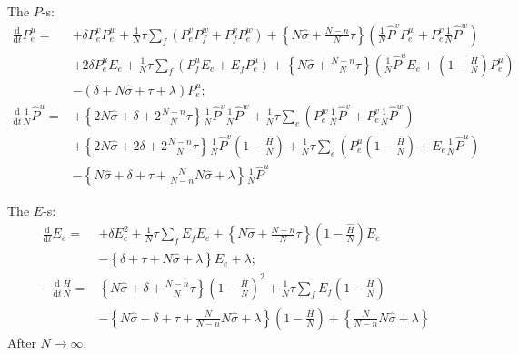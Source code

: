\documentclass[preprint, 
superscriptaddress,aip,author-year]{revtex4-1}
\begin{document}
\noindent The $P$-s:
\begin{align}
 \frac{\mathrm{d}}{\mathrm{d} t} P_e^u  =&  
+ \delta P_e^v  P_e^w + \frac{1}{N} \tau \sum_f  \left( P_e^v P_f^w +
  P_f^v P_e^w  \right) + \left\{ N \hat \sigma + \frac{N-n}{N} \tau
\right\}\left(  \frac{1}{N} \hat P^v P_e^w +P_e^v \frac{1}{N} \hat P^w \right)\nonumber \\
&+ 2 \delta P_e^u E_e + \frac{1}{N} \tau \sum_f  \left( P_f^u E_e 
+ E_f P_e^u \right) + \left\{ N \hat \sigma +  \frac{N-n}{N} \tau \right\} \left(\frac{1}{N} \hat P^u  E_e + (1-\frac{\hat H}{N})  P_e^u\right) \nonumber \\
& -  ( \delta    +  N \hat \sigma  + \tau  + \lambda ) P_e^u;
\tag{PE}\\ 
\frac{\mathrm{d}}{\mathrm{d} t}  \frac{1}{N} \hat P^u =& 
 +\left\{ 2 N \hat \sigma+  \delta + 2 \frac{N-n}{N} \tau \right\} \frac{1}{N} \hat P^v \frac{1}{N} \hat P^w  + \frac{1}{N}\tau \sum_e \left( P_e^w \frac{1}{N} \hat P^v +  P_e^v \frac{1}{N} \hat P^w \right) \nonumber \\
&  +\left\{ 2 N \hat \sigma+  2\delta + 2 \frac{N-n}{N} \tau \right\} \frac{1}{N} \hat P^v  (1-\frac{\hat H}{N})  + \frac{1}{N}\tau \sum_e \left( P_e^u (1-\frac{\hat H}{N}) +  E_e \frac{1}{N} \hat P^u \right) 
\nonumber \\
& -\left\{N \hat \sigma + \delta +\tau + \frac{N}{N-n} N \hat \sigma + \lambda \right\}  \frac{1}{N} \hat P^u
\tag{PB}
\end{align}


\noindent The $E$-s:
\begin{align}
\frac{\mathrm{d}}{\mathrm{d} t} E_e =&
+\delta E_e^2 + \frac{1}{N} \tau\sum_{f } E_f  E_e  + \left\{ N \hat \sigma  + \frac{N-n}{N} \tau \right\}(1-\frac{\hat H}{N})  E_e\nonumber \\
& - \left\{ \delta + \tau + N \hat \sigma + \lambda \right\} E_e +\lambda; \tag{EE} \\
- \frac{\mathrm{d}}{\mathrm{d} t} \frac{\hat H}{N} =&
\left\{ N \hat \sigma  + \delta +  \frac{N-n}{N} \tau\right\}  \left(1-\frac{\hat H}{N}\right)^2 +\frac{1}{N} \tau\sum_{f } E_f (1-\frac{\hat H}{N}) \nonumber \\
& - \left\{ N \hat \sigma  + \delta +  \tau + \frac{N}{N-n} N \hat \sigma +  \lambda \right\}(1-\frac{\hat H}{N})  +  \left\{\frac{N}{N-n} N \hat \sigma +  \lambda \right\}
\tag{EB} 
 \end{align}
\newpage
After $N \to \infty$:
\end{document}
